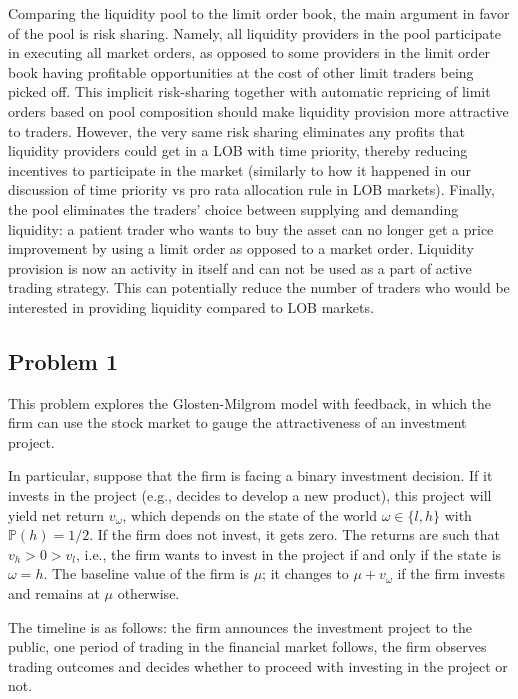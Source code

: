 \begin{solution}
	Comparing the liquidity pool to the limit order book, the main argument in favor of the pool is risk sharing. Namely, all liquidity providers in the pool participate in executing all market orders, as opposed to some providers in the limit order book having profitable opportunities at the cost of other limit traders being picked off. This implicit risk-sharing together with automatic repricing of limit orders based on pool composition should make liquidity provision more attractive to traders. However, the very same risk sharing eliminates any profits that liquidity providers could get in a LOB with time priority, thereby reducing incentives to participate in the market (similarly to how it happened in our discussion of time priority vs pro rata allocation rule in LOB markets).
	Finally, the pool eliminates the traders' choice between supplying and demanding liquidity: a patient trader who wants to buy the asset can no longer get a price improvement by using a limit order as opposed to a market order. Liquidity provision is now an activity in itself and can not be used as a part of active trading strategy. This can potentially reduce the number of traders who would be interested in providing liquidity compared to LOB markets.
\end{solution}



\fi





\ifreexam


\subsection*{Problem 1}
	This problem explores the Glosten-Milgrom model with feedback, in which the firm can use the stock market to gauge the attractiveness of an investment project.
	
	In particular, suppose that the firm is facing a binary investment decision. If it invests in the project (e.g., decides to develop a new product), this project will yield net return $v_\omega$, which depends on the state of the world $\omega \in \{l,h\}$ with $\mathbb{P}(h)=1/2$. If the firm does not invest, it gets zero. The returns are such that $v_h > 0 > v_l$, i.e., the firm wants to invest in the project if and only if the state is $\omega=h$. The baseline value of the firm is $\mu$; it changes to $\mu + v_\omega$ if the firm invests and remains at $\mu$ otherwise.
	
	The timeline is as follows: the firm announces the investment project to the public, one period of trading in the financial market follows, the firm observes trading outcomes and decides whether to proceed with investing in the project or not.
	
